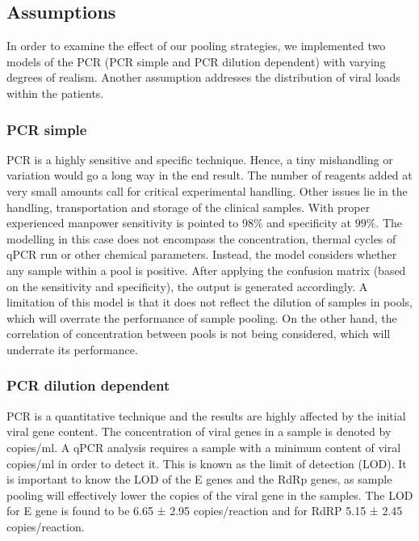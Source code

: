 \documentclass[fleqn,10pt]{wlscirep}
\begin{document}
\subsection{Assumptions}

In order to examine the effect of our pooling strategies, we implemented two models of the PCR (PCR simple and PCR dilution dependent) with varying degrees of realism. Another assumption addresses the distribution of viral loads within the patients.

\subsubsection{PCR simple}

PCR is a highly sensitive and specific technique. Hence, a tiny mishandling or variation would go a long way in the end result. The number of reagents added at very small amounts call for critical experimental handling. Other issues lie in the handling, transportation and storage of the clinical samples. With proper experienced manpower sensitivity is pointed to $98 \%$ and specificity at $99 \%$. The modelling in this case does not encompass the concentration, thermal cycles of qPCR run or other chemical parameters. Instead, the model considers whether any sample within a pool is positive. After applying the confusion matrix (based on the sensitivity and specificity), the output is generated accordingly. A limitation of this model is that it does not reflect the dilution of samples in pools, which will overrate the performance of sample pooling. On the other hand, the correlation of concentration between pools is not being considered, which will underrate its performance.


\subsubsection{PCR dilution dependent}
PCR is a quantitative technique and the results are highly affected by the initial viral gene content. The concentration of viral genes in a sample is denoted by copies/ml. A qPCR analysis requires a sample with a minimum content of viral copies/ml in order to detect it. This is known as the limit of detection (LOD). It is important to know the LOD of the E genes and the RdRp genes, as sample pooling will effectively lower the copies of the viral gene in the samples. The LOD for E gene is found to be 6.65 ± 2.95 copies/reaction and for RdRP 5.15 ± 2.45 copies/reaction.\\
\end{document}
